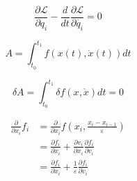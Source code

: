 $$
\frac{\partial \mathcal{L}}{\partial q_i} - \frac{d}{dt}\frac{\partial \mathcal{L}}{\partial \dot{q_i}} = 0
$$


$$ A = \int_{t_0}^{t_1} f(x(t), \dot{x}(t)) dt $$

$$
\delta A = \int_{t_0}^{t_1} \delta f(x, \dot{x})dt = 0
$$

\begin{align*}
    \frac{\partial}{\partial x_i} f_i &=
    \frac{\partial}{\partial x_i} f \left(x_i, \frac{x_i - x_{i-1}}{\varepsilon}\right) \\
    &= \frac{\partial f_i}{\partial x_i} + \frac{\partial v_i}{\partial x_i} \frac{\partial f_i}{\partial v_i} \\
    &= \frac{\partial f_i}{\partial x_i} + \frac{1}{\varepsilon} \frac{\partial f_i}{\partial v_i}
    \end{align*}
